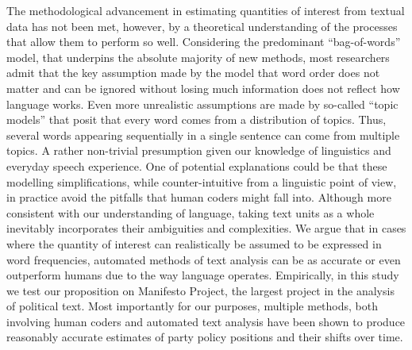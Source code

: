 \documentclass[a4paper, 12pt]{article}
\begin{document}
The methodological advancement in estimating quantities of interest from textual data has not been met, however, by a theoretical understanding of the processes that allow them to perform so well. Considering the predominant \enquote{bag-of-words} model, that underpins the absolute majority of new methods, most researchers admit that the key assumption made by the model that word order does not matter and can be ignored without losing much information does not reflect how language works. Even more unrealistic assumptions are made by so-called \enquote{topic models} \citep{Blei2003} that posit that every word comes from a distribution of topics. Thus, several words appearing sequentially in a single sentence can come from multiple topics. A rather non-trivial presumption given our knowledge of linguistics and everyday speech experience. One of potential explanations could be that these modelling simplifications, while counter-intuitive from a linguistic point of view, in practice avoid the pitfalls that human coders might fall into. Although more consistent with our understanding of language, taking text units as a whole inevitably incorporates their ambiguities and complexities. We argue that in cases where the quantity of interest can realistically be assumed to be expressed in word frequencies, automated methods of text analysis can be as accurate or even outperform humans due to the way language operates. Empirically, in this study we test our proposition on Manifesto Project, the largest project in the analysis of political text. Most importantly for our purposes, multiple methods, both involving human coders and automated text analysis have been shown to produce reasonably accurate estimates of party policy positions and their shifts over time.
\end{document}
